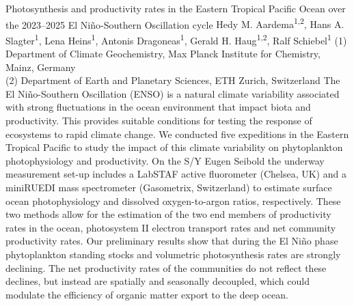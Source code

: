 \begin{conf-abstract}
{Photosynthesis and productivity rates in the Eastern Tropical Pacific Ocean over the 2023--2025 El Niño-Southern Oscillation cycle}
{Hedy M. Aardema\textsuperscript{1,2}, Hans A. Slagter\textsuperscript{1}, Lena Heins\textsuperscript{1}, Antonis Dragoneas\textsuperscript{1}, Gerald H. Haug\textsuperscript{1,2}, Ralf Schiebel\textsuperscript{1}}
{(1) Department of Climate Geochemistry, Max Planck Institute for Chemistry, Mainz, Germany\\
(2) Department of Earth and Planetary Sciences, ETH Zurich, Switzerland}
{The El Niño-Southern Oscillation (ENSO) is a natural climate variability associated with strong fluctuations in the ocean environment that impact biota and productivity. This provides suitable conditions for testing the response of ecosystems to rapid climate change. We conducted five expeditions in the Eastern Tropical Pacific to study the impact of this climate variability on phytoplankton photophysiology and productivity. On the S/Y Eugen Seibold the underway measurement set-up includes a LabSTAF active fluorometer (Chelsea, UK) and a miniRUEDI mass spectrometer (Gasometrix, Switzerland) to estimate surface ocean photophysiology and dissolved oxygen-to-argon ratios, respectively. These two methods allow for the estimation of the two end members of productivity rates in the ocean, photosystem II electron transport rates and net community productivity rates. Our preliminary results show that during the El Niño phase phytoplankton standing stocks and volumetric photosynthesis rates are strongly declining. The net productivity rates of the communities do not reflect these declines, but instead are spatially and seasonally decoupled, which could modulate the efficiency of organic matter export to the deep ocean.}
\end{conf-abstract}
